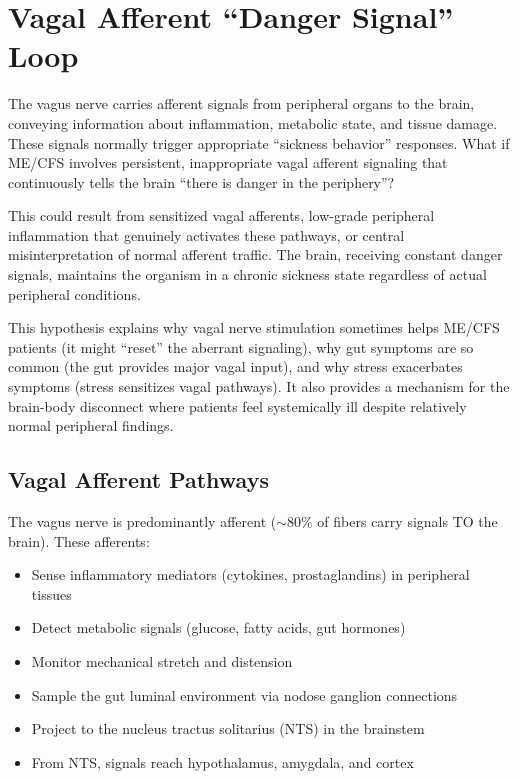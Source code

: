 \section{Vagal Afferent ``Danger Signal'' Loop}
\label{sec:vagal-loop}

\begin{open_question}
The vagus nerve carries afferent signals from peripheral organs to the brain, conveying information about inflammation, metabolic state, and tissue damage. These signals normally trigger appropriate ``sickness behavior'' responses. What if ME/CFS involves persistent, inappropriate vagal afferent signaling that continuously tells the brain ``there is danger in the periphery''?

This could result from sensitized vagal afferents, low-grade peripheral inflammation that genuinely activates these pathways, or central misinterpretation of normal afferent traffic. The brain, receiving constant danger signals, maintains the organism in a chronic sickness state regardless of actual peripheral conditions.

This hypothesis explains why vagal nerve stimulation sometimes helps ME/CFS patients (it might ``reset'' the aberrant signaling), why gut symptoms are so common (the gut provides major vagal input), and why stress exacerbates symptoms (stress sensitizes vagal pathways). It also provides a mechanism for the brain-body disconnect where patients feel systemically ill despite relatively normal peripheral findings.
\end{open_question}

\subsection{Vagal Afferent Pathways}

The vagus nerve is predominantly afferent ($\sim$80\% of fibers carry signals TO the brain). These afferents:

\begin{itemize}
    \item Sense inflammatory mediators (cytokines, prostaglandins) in peripheral tissues
    \item Detect metabolic signals (glucose, fatty acids, gut hormones)
    \item Monitor mechanical stretch and distension
    \item Sample the gut luminal environment via nodose ganglion connections
    \item Project to the nucleus tractus solitarius (NTS) in the brainstem
    \item From NTS, signals reach hypothalamus, amygdala, and cortex
\end{itemize}

